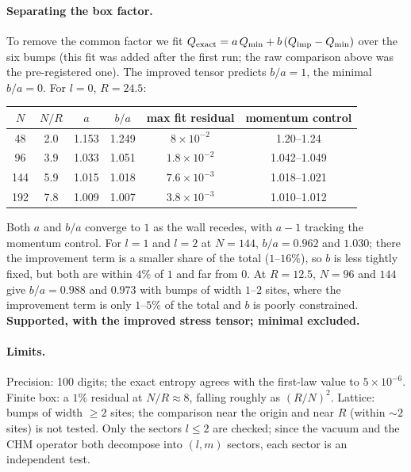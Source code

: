 \documentclass[11pt]{article}
\begin{document}
\paragraph{Separating the box factor.} To remove the common factor we fit $Q_{\rm exact}=a\,Q_{\min}+b\,(Q_{\rm imp}-Q_{\min})$ over the six bumps (this fit was added after the first run; the raw comparison above was the pre-registered one). The improved tensor predicts $b/a=1$, the minimal $b/a=0$. For $l=0$, $R=24.5$:
\begin{center}\small
\begin{tabular}{cccccc}\toprule
$N$ & $N/R$ & $a$ & $b/a$ & max fit residual & momentum control\\\midrule
48 & 2.0 & 1.153 & 1.249 & $8\times10^{-2}$ & 1.20--1.24\\
96 & 3.9 & 1.033 & 1.051 & $1.8\times10^{-2}$ & 1.042--1.049\\
144 & 5.9 & 1.015 & 1.018 & $7.6\times10^{-3}$ & 1.018--1.021\\
192 & 7.8 & 1.009 & 1.007 & $3.8\times10^{-3}$ & 1.010--1.012\\\bottomrule
\end{tabular}
\end{center}
Both $a$ and $b/a$ converge to $1$ as the wall recedes, with $a-1$ tracking the momentum control. For $l=1$ and $l=2$ at $N=144$, $b/a=0.962$ and $1.030$; there the improvement term is a smaller share of the total ($1$--$16\%$), so $b$ is less tightly fixed, but both are within $4\%$ of $1$ and far from $0$. At $R=12.5$, $N=96$ and $144$ give $b/a=0.988$ and $0.973$ with bumps of width $1$--$2$ sites, where the improvement term is only $1$--$5\%$ of the total and $b$ is poorly constrained. \textbf{Supported, with the improved stress tensor; minimal excluded.}

\paragraph{Limits.} Precision: 100 digits; the exact entropy agrees with the first-law value to $5\times10^{-6}$. Finite box: a $1\%$ residual at $N/R\approx8$, falling roughly as $(R/N)^2$. Lattice: bumps of width $\ge2$ sites; the comparison near the origin and near $R$ (within $\sim2$ sites) is not tested. Only the sectors $l\le2$ are checked; since the vacuum and the CHM operator both decompose into $(l,m)$ sectors, each sector is an independent test.
\end{document}
